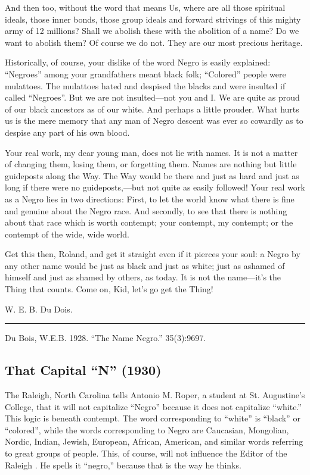 \documentclass[letterpaper,10pt,english]{jupyterBook}
\begin{document}
\sphinxAtStartPar
And then too, without the word that means Us, where are all those spiritual ideals, those inner bonds, those group ideals and forward strivings of this mighty army of 12 millions? Shall we abolish these with the abolition of a name? Do we want to abolish them? Of course we do not. They are our most precious heritage.

\sphinxAtStartPar
Historically, of course, your dislike of the word Negro is easily explained: “Negroes” among your grandfathers meant black folk; “Colored” people were mulattoes. The mulattoes hated and despised the blacks and were insulted if called “Negroes”. But we are not insulted—not you and I. We are quite as proud of our black ancestors as of our white. And perhaps a little prouder. What hurts us is the mere memory that any man of Negro descent was ever so cowardly as to despise any part of his own blood.

\sphinxAtStartPar
Your real work, my dear young man, does not lie with names. It is not a matter of changing them, losing them, or forgetting them. Names are nothing but little guideposts along the Way. The Way would be there and just as hard and just as long if there were no guideposts,—but not quite as easily followed! Your real work as a Negro lies in two directions: First, to let the world know what there is fine and genuine about the Negro race. And secondly, to see that there is nothing about that race which is worth contempt; your contempt, my contempt; or the contempt of the wide, wide world.

\sphinxAtStartPar
Get this then, Roland, and get it straight even if it pierces your soul: a Negro by any other name would be just as black and just as white; just as ashamed of himself and just as shamed by others, as today. It is not the name—it’s the Thing that counts. Come on, Kid, let’s go get the Thing!

\sphinxAtStartPar
W. E. B. Du Dois.


\bigskip\hrule\bigskip


\sphinxAtStartPar
{} Du Bois, W.E.B. 1928. “The Name Negro.”   35(3):96\sphinxhyphen{}97.


\subsection{That Capital “N” (1930)}
\label{\detokenize{Volumes/37/02/that_capital_n:that-capital-n-1930}}\label{\detokenize{Volumes/37/02/that_capital_n::doc}}
\sphinxAtStartPar
The Raleigh, North Carolina  tells Antonio M. Roper, a student at St. Augustine’s College, that it will not capitalize “Negro” because it does not capitalize “white.” This logic is beneath contempt. The word corresponding to “white” is “black” or “colored”, while the words corresponding to Negro are Caucasian, Mongolian, Nordic, Indian, Jewish, European, African, American, and similar words referring to great groups of people. This, of course, will not influence the Editor of the Raleigh . He spells it “negro,” because that is the way he thinks.
\end{document}
